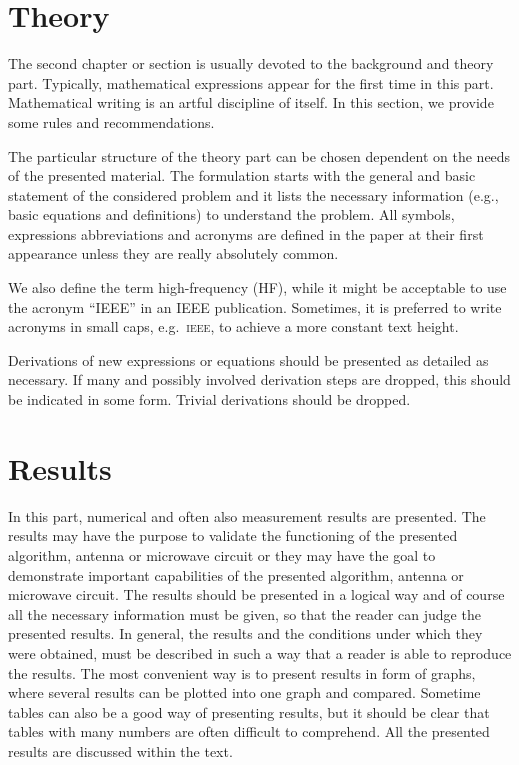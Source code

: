 \section{Theory} %
The second chapter or section is usually devoted to the background and theory part. 
Typically, mathematical expressions appear for the first time in this part. 
Mathematical writing is an artful discipline of itself. 
In this section, we provide some rules and recommendations.

The particular structure of the theory part can be chosen dependent on the needs of the presented material. 
The formulation starts with the general and basic statement of the considered problem and it lists the necessary information (e.g., basic equations and definitions) to understand the problem. 
All symbols, expressions abbreviations and acronyms are defined in the paper at their first appearance unless they are really absolutely common. 

We also define the term high-frequency (HF), while it might be acceptable to use the acronym “IEEE” in an IEEE publication. 
Sometimes, it is preferred to write acronyms in small caps, e.g.\ \textsc{ieee}, to achieve a more constant text height. 

Derivations of new expressions or equations should be presented as detailed as necessary. 
If many and possibly involved derivation steps are dropped, this should be indicated in some form. 
Trivial derivations should be dropped.

\section{Results} %
In this part, numerical and often also measurement results are presented. 
The results may have the purpose to validate the functioning of the presented algorithm, antenna or microwave circuit 
or they may have the goal to demonstrate important capabilities of the presented algorithm, antenna or microwave circuit. 
The results should be presented in a logical way and of course all the necessary information must be given, so that the reader can judge the presented results. 
In general, the results and the conditions under which they were obtained, must be described in such a way that a reader is able to reproduce the results. 
The most convenient way is to present results in form of graphs, where several results can be plotted into one graph and compared. 
Sometime tables can also be a good way of presenting results, but it should be clear that tables with many numbers are often difficult to comprehend. 
All the presented results are discussed within the text.

